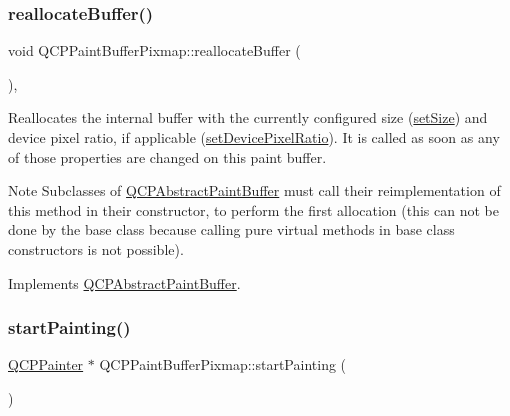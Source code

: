 \subsubsection{\texorpdfstring{reallocate\+Buffer()}{reallocateBuffer()}}
{\footnotesize\ttfamily void Q\+C\+P\+Paint\+Buffer\+Pixmap\+::reallocate\+Buffer (\begin{DoxyParamCaption}{ }\end{DoxyParamCaption})\hspace{0.3cm}{\ttfamily [protected]}, {\ttfamily [virtual]}}

Reallocates the internal buffer with the currently configured size (\hyperlink{classQCPAbstractPaintBuffer_a8b68c3cd36533f1a4a23b5ce8cd66f01}{set\+Size}) and device pixel ratio, if applicable (\hyperlink{classQCPAbstractPaintBuffer_a555eaad5d5c806420ff35602a1bb68fa}{set\+Device\+Pixel\+Ratio}). It is called as soon as any of those properties are changed on this paint buffer.

\begin{DoxyNote}{Note}
Subclasses of \hyperlink{classQCPAbstractPaintBuffer}{Q\+C\+P\+Abstract\+Paint\+Buffer} must call their reimplementation of this method in their constructor, to perform the first allocation (this can not be done by the base class because calling pure virtual methods in base class constructors is not possible). 
\end{DoxyNote}


Implements \hyperlink{classQCPAbstractPaintBuffer_aee7506a52bd7e5a07c2af27935eb13e7}{Q\+C\+P\+Abstract\+Paint\+Buffer}.

\mbox{\label{classQCPPaintBufferPixmap_a357964ef7d28cfa530338be4e5c93234}} 
\subsubsection{\texorpdfstring{start\+Painting()}{startPainting()}}
{\footnotesize\ttfamily \hyperlink{classQCPPainter}{Q\+C\+P\+Painter} $\ast$ Q\+C\+P\+Paint\+Buffer\+Pixmap\+::start\+Painting (\begin{DoxyParamCaption}{ }\end{DoxyParamCaption})\hspace{0.3cm}{\ttfamily [virtual]}}

